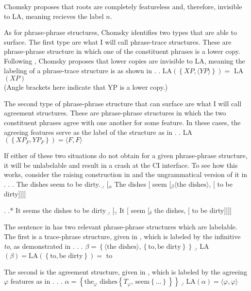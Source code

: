 \documentclass[MilwayThesis]{subfiles}
\begin{document}
Chomsky proposes that roots are completely featureless and, therefore, invisible to LA, meaning \Last[a] recieves the label $n$.

As for phrase-phrase structures, Chomsky identifies two types that are able to surface.
The first type are what I will call phrase-trace structures.
These are phrase-phrase structure in which one of the constituent phrases is a lower copy.
Following \textcite{moro2000dynamic}, Chomsky proposes that lower copies are invisible to LA, meaning the labeling of a phrase-trace structure is as shown in \Next.
\ex. LA$(\left\{ XP, \langle YP\rangle \right\}) =$ LA$(XP)$\\
(Angle brackets here indicate that YP is a lower copy.)

The second type of phrase-phrase structure that can surface are what I will call agreement structures.
These are phrase-phrase structures in which the two constituent phrases agree with one another for some feature.
In these cases, the agreeing features serve as the label of the structure as in \Next.
\ex. LA$(\left\{ XP_F, YP_F \right\}) = \langle F,F\rangle$

If either of these two situations do not obtain for a given phrase-phrase structure, it will be unlabelable and result in a crash at the CI interface.
To see how this works, consider the raising construction in \Next and the ungrammatical version of it in \NNext.
\ex.\label{ex:raising}
\a. The dishes seem to be dirty.
\b. [$_\alpha$ The dishes [ seem [$_\beta \langle\text{the dishes}\rangle$, [ to be dirty]]]]

\ex.\label{ex:noraising}
\a.* It seems the dishes to be dirty
\b. [$_\gamma$ It [ seem [$_\delta$ the dishes, [ to be dirty]]]]

The sentence in \LLast has two relevant phrase-phrase structures which are labelable.
The first is a trace-phrase structure, given in \Next[a], which is labeled by the infinitive \textit{to}, as demonstrated in \Next[b].
\ex.
\a.  $\beta = \left\{ \langle\text{the dishes}\rangle, \left\{ \text{to}, \text{be dirty} \right\} \right\}$
\b. LA$(\beta) = \text{LA}(\left\{ \text{to}, \text{be dirty} \right\}) =$ to

The second is the agreement structure, given in \Next[b], which is labeled by the agreeing $\varphi$ features as in \Next[b].
\ex.
\a. $\alpha = \left\{ \text{the}_\varphi \text{ dishes} \left\{ T_\varphi \text{, seem} \left\{ \ldots \right\} \right\} \right\}$
\b. LA$(\alpha) = \langle\varphi, \varphi\rangle$
\end{document}
